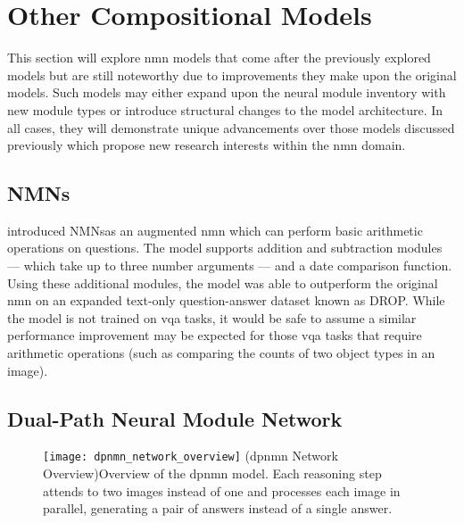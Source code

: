 \graphicspath{{content/chapters/literature_review/other_compositional_models/figures}}

\section{Other Compositional Models}
\label{sec:other_compositional_models}

This section will explore \gls{nmn} models that come after the previously explored models but are still noteworthy due to improvements they make upon the original models.
Such models may either expand upon the neural module inventory with new module types or introduce structural changes to the model architecture.
In all cases, they will demonstrate unique advancements over those models discussed previously which propose new research interests within the \gls{nmn} domain.

\subsection{NMNs\pm}
\label{subsec:nmn_plus_minus}

\citeauthor{chen_teaching_2022}\cite{chen_teaching_2022} introduced NMNs\pm as an augmented \gls{nmn} which can perform basic arithmetic operations on questions.
The model supports addition and subtraction modules --- which take up to three number arguments --- and a date comparison function.
Using these additional modules, the model was able to outperform the original \gls{nmn} on an expanded text-only question-answer dataset known as DROP.
While the model is not trained on \gls{vqa} tasks, it would be safe to assume a similar performance improvement may be expected for those \gls{vqa} tasks that require arithmetic operations (such as comparing the counts of two object types in an image).


\subsection{Dual-Path Neural Module Network}
\label{subsec:dual_path_neural_module_network}

\begin{figure}[htbp]
    \centering
    \texttt{[image: dpnmn\_network\_overview]}
    \captionsource(\acrshort{dpnmn} Network Overview){Overview of the \acrshort{dpnmn} model. Each reasoning step attends to two images instead of one and processes each image in parallel, generating a pair of answers instead of a single answer. \label{fig:dpnmn_network_overview}}{\citeauthor{su_toward_2020}\cite{su_toward_2020}}
\end{figure}

